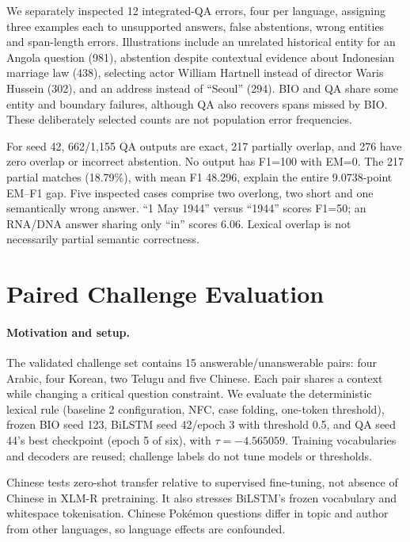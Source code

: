 \documentclass[11pt]{article}
\begin{document}
We separately inspected 12 integrated-QA errors, four per language, assigning three examples each to unsupported answers, false abstentions, wrong entities and span-length errors. Illustrations include an unrelated historical entity for an Angola question (981), abstention despite contextual evidence about Indonesian marriage law (438), selecting actor William Hartnell instead of director Waris Hussein (302), and an address instead of ``Seoul'' (294). BIO and QA share some entity and boundary failures, although QA also recovers spans missed by BIO. These deliberately selected counts are not population error frequencies.

For seed 42, 662/1,155 QA outputs are exact, 217 partially overlap, and 276 have zero overlap or incorrect abstention. No output has F1=100 with EM=0. The 217 partial matches (18.79\%), with mean F1 48.296, explain the entire 9.0738-point EM--F1 gap. Five inspected cases comprise two overlong, two short and one semantically wrong answer. ``1 May 1944'' versus ``1944'' scores F1=50; an RNA/DNA answer sharing only ``in'' scores 6.06. Lexical overlap is not necessarily partial semantic correctness.

\section{Paired Challenge Evaluation}
\paragraph{Motivation and setup.}
The validated challenge set contains 15 answerable/unanswerable pairs: four Arabic, four Korean, two Telugu and five Chinese. Each pair shares a context while changing a critical question constraint. We evaluate the deterministic lexical rule (baseline 2 configuration, NFC, case folding, one-token threshold), frozen BIO seed 123, BiLSTM seed 42/epoch 3 with threshold 0.5, and QA seed 44's best checkpoint (epoch 5 of six), with $\tau=-4.565059$. Training vocabularies and decoders are reused; challenge labels do not tune models or thresholds.

Chinese tests zero-shot transfer relative to supervised fine-tuning, not absence of Chinese in XLM-R pretraining. It also stresses BiLSTM's frozen vocabulary and whitespace tokenisation. Chinese Pokémon questions differ in topic and author from other languages, so language effects are confounded.
\end{document}
